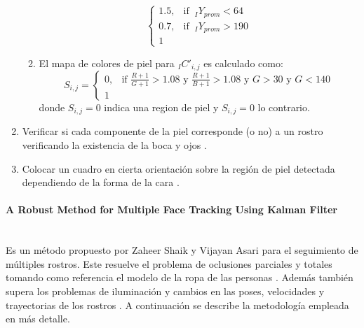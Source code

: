 \documentclass[a4paper,openright,12pt]{report}
\begin{document}
\begin{enumerate}[label=(\alph*)]
\begin{framed}
\begin{enumerate}[label=\arabic*.]
\begin{equation}
                    \begin{cases}
                        1.5, & \text{if }\ {}_{I}Y_{prom}<64\\
                        0.7, & \text{if }\ {}_{I}Y_{prom}>190\\
                        1
                    \end{cases}
                \end{equation}
            \item El mapa de colores de piel para ${}_{I}C'_{i,j}$ es calculado
                como:
                \begin{equation}
                    S_{i,j}=
                    \begin{cases}
                        0, & \text{if $\frac{R + 1}{G + 1}>1.08$ y $\frac{R + 1}{B + 1}>1.08$ y $G>30$ y $G<140$}\\
                        1
                    \end{cases}
                \end{equation}
                donde $S_{i,j}=0$ indica una region de piel y $S_{i,j}=0$ lo contrario.
        \end{enumerate}
        \raggedleft\cite{sarkar2012real}
    \end{framed}

    \item Verificar si cada componente de la piel corresponde (o no) a un
        rostro verificando la existencia de la boca y ojos \cite{sarkar2012real}.
    \item Colocar un cuadro en cierta orientación sobre la región de piel
        detectada dependiendo de la forma de la cara \cite{sarkar2012real}.
\end{enumerate}

\paragraph{A Robust Method for Multiple Face Tracking Using Kalman Filter}\mbox{} \\

Es un método propuesto por Zaheer Shaik y Vijayan Asari para el seguimiento de
múltiples rostros. Este resuelve el problema de oclusiones parciales y totales 
tomando como referencia el modelo de la ropa de las personas \cite{shaik2007robust}. Además también
supera los problemas de iluminación y cambios en las poses, velocidades y
trayectorias de los rostros \cite{shaik2007robust}. A continuación se describe la metodología empleada 
en más detalle.\\
\end{document}
